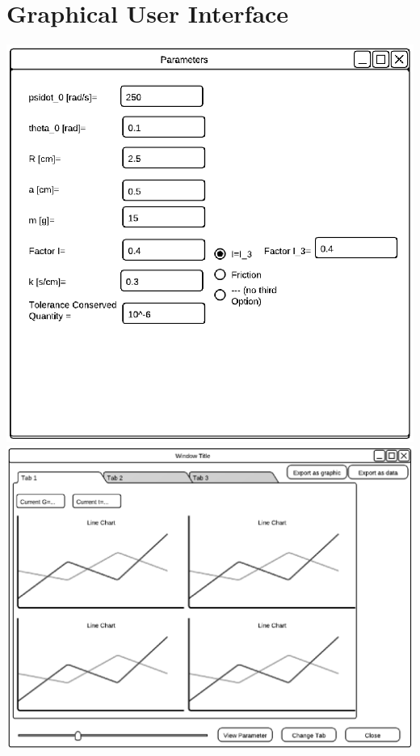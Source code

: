 \section{Graphical User Interface}
\label{sec:3.3}
\includegraphics[width=6in,keepaspectratio=true]{figures/GUIParameterInputForm.eps}
\includegraphics[width=6in,keepaspectratio=true]{figures/GUIDisplayForm.eps}
